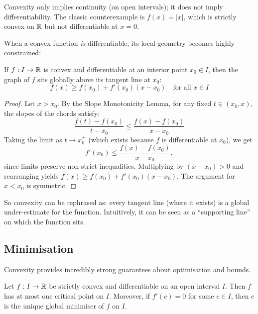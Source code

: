 \documentclass[../analysis1.tex]{subfiles}
\begin{document}
\begin{remark}
    Convexity only implies continuity (on open intervals); it does not imply differentiability. The classic counterexample is $f(x) = |x|$, which is strictly convex on $\mathbb{R}$ but not differentiable at $x=0$.
\end{remark}

When a convex function \textit{is} differentiable, its local geometry becomes highly constrained:

\begin{theorem}
\label{thm:convextangent}
    \begin{shaded*}
        If $f: I \to \mathbb{R}$ is convex and differentiable at an interior point $x_0 \in I$, then the graph of $f$ sits globally above its tangent line at $x_0$:
        $$ f(x) \ge f(x_0) + f'(x_0)(x-x_0) \quad \text{for all } x \in I $$
    \end{shaded*}
\end{theorem}

\begin{proof}
    Let $x > x_0$. By the Slope Monotonicity Lemma, for any fixed $t \in (x_0, x)$, the slopes of the chords satisfy:
    \[ \frac{f(t)-f(x_0)}{t-x_0} \le \frac{f(x)-f(x_0)}{x-x_0} \]
    Taking the limit as $t \to x_0^+$ (which exists because $f$ is differentiable at $x_0$), we get
    \[f'(x_0) \le \frac{f(x)-f(x_0)}{x-x_0}, \]
    since limits preserve non-strict inequalities.
    Multiplying by $(x-x_0) > 0$ and rearranging yields $f(x) \ge f(x_0) + f'(x_0)(x-x_0)$. The argument for $x < x_0$ is symmetric.\qedhere
\end{proof}

\begin{remark}
    So convexity can be rephrased as: every tangent line (where it exists) is a global under-estimate for the function. Intuitively, it can be seen as a ``supporting line'' on which the function sits.
\end{remark}

\subsection{Minimisation}

Convexity provides incredibly strong guarantees about optimisation and bounds.

\begin{theorem}
    \begin{shaded*}
        Let $f: I \to \mathbb{R}$ be strictly convex and differentiable on an open interval $I$. Then $f$ has at most one critical point on $I$. Moreover, if $f'(c) = 0$ for some $c \in I$, then $c$ is the unique global minimiser of $f$ on $I$.
    \end{shaded*}
\end{theorem}
\end{document}
